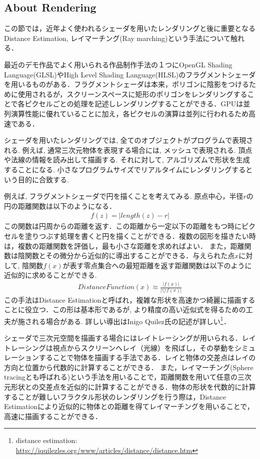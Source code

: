 \subsection{About Rendering}

この節では，近年よく使われるシェーダを用いたレンダリングと後に重要となるDistance Estimation, レイマーチング(Ray marching)という手法について触れる．

最近のデモ作品でよく用いられる作品制作手法の１つにOpenGL Shading Language(GLSL)やHigh Level Shading Language(HLSL)のフラグメントシェーダを用いるものがある．フラグメントシェーダは本来，ポリゴンに陰影をつけるために使用されるが，スクリーンスペースに矩形のポリゴンをレンダリングすることで各ピクセルごとの処理を記述しレンダリングすることができる．GPUは並列演算性能に優れていることに加え，各ピクセルの演算は並列に行われるため高速である．

シェーダを用いたレンダリングでは, 全てのオブジェクトがプログラムで表現される.
例えば,  通常三次元物体を表現する場合には, メッシュで表現される. 
頂点や法線の情報を読み出して描画する.
それに対して, アルゴリズムで形状を生成することになる.  
小さなプログラムサイズでリアルタイムにレンダリングするという目的に合致する. 

例えば, フラグメントシェーダで円を描くことを考えてみる. 
原点中心，半径$r$の円の距離関数は以下のようになる．
\begin{eqnarray*}
 f(z) = | length(z) - r |
\end{eqnarray*}
この関数は円周からの距離を返す．この距離から一定以下の距離をもつ時にピクセルを塗りつぶす処理を書くと円を描くことができる．複数の図形を描きたい時は，複数の距離関数を評価し，最も小さな距離を求めればよい．
また，距離関数は陰関数とその微分から近似的に導出することができる．与えられた点$x$に対して, 陰関数$f(x)$が表す零点集合への最短距離を返す距離関数は以下のように近似的に求めることができる. 
\begin{eqnarray*}
 DistanceFunction(x) \approx \frac{|f(x)|}{|\bigtriangledown f(x)|}
\end{eqnarray*}
この手法はDistance Estimationと呼ばれ，複雑な形状を高速かつ綺麗に描画することに役立つ．この形は基本形であるが, より精度の高い近似式を得るための工夫が施される場合がある. 詳しい導出はInigo Quilez氏の記述が詳しい\footnote{distance estimation: \url{http://iquilezles.org/www/articles/distance/distance.htm}}．

シェーダで三次元空間を描画する場合にはレイトレーシングが用いられる．レイトレーシングは視点からスクリーンへレイ（光線）を飛ばし，その挙動をシミュレーションすることで物体を描画する手法である．レイと物体の交差点はレイの方向と位置から代数的に計算することができる．
また，レイマーチング(Sphere tracingとも呼ばれる)\cite{sphereTracing}という手法を用いることで，距離関数を用いて任意の三次元形状との交差点を近似的に計算することができる．物体の形状を代数的に計算することが難しいフラクタル形状のレンダリングを行う際は，Distance Estimationにより近似的に物体との距離を得てレイマーチングを用いることで，高速に描画することができる．

